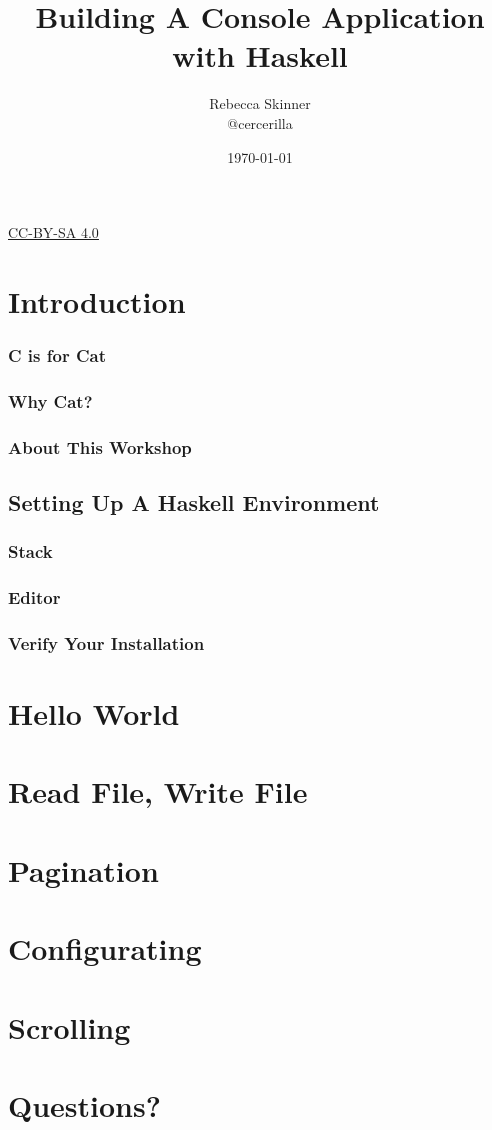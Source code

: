\documentclass{beamer}
\title{Building A Console Application with Haskell}
\author{Rebecca Skinner\\ \small{@cercerilla}}
\date{\today}
\newcommand{\chref}[3] {
  {\color{#1} \href{#2}{\underline{#3}}}
}
\begin{document}
\begin{frame}
  \titlepage{}
\end{frame}
\begin{frame}
  \begin{center}
    \small{\chref{blue}{http://creativecommons.org/licenses/by-sa/4.0/}{CC-BY-SA 4.0}}
  \end{center}
\end{frame}

\section{Introduction}

\begin{frame}
  \frametitle{C is for Cat}
\end{frame}

\begin{frame}
  \frametitle{Why Cat?}
\end{frame}

\begin{frame}
  \frametitle{About This Workshop}
\end{frame}

\subsection{Setting Up A Haskell Environment}

\begin{frame}
  \frametitle{Stack}
\end{frame}

\begin{frame}
  \frametitle{Editor}
\end{frame}

\begin{frame}
  \frametitle{Verify Your Installation}
\end{frame}

\section{Hello World}

\section{Read File, Write File}

\section{Pagination}

\section{Configurating}

\section{Scrolling}

\section{Questions?}
\end{document}
